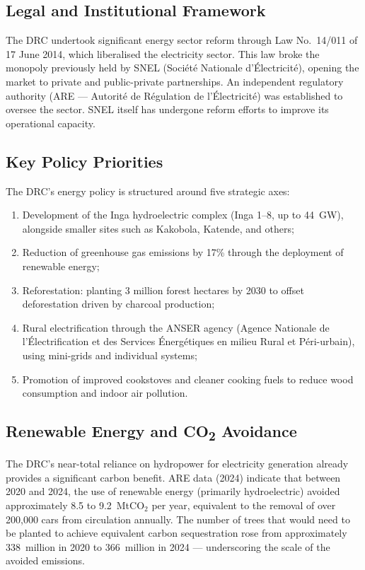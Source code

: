 \subsection{Legal and Institutional Framework}

The DRC undertook significant energy sector reform through Law No.\ 14/011 of 17 June 2014, which liberalised the electricity sector. This law broke the monopoly previously held by SNEL (Société Nationale d'Électricité), opening the market to private and public-private partnerships. An independent regulatory authority (ARE — Autorité de Régulation de l'Électricité) was established to oversee the sector. SNEL itself has undergone reform efforts to improve its operational capacity.

\subsection{Key Policy Priorities}

The DRC's energy policy is structured around five strategic axes:

\begin{enumerate}[noitemsep]
    \item Development of the Inga hydroelectric complex (Inga 1--8, up to 44~GW), alongside smaller sites such as Kakobola, Katende, and others;
    \item Reduction of greenhouse gas emissions by 17\% through the deployment of renewable energy;
    \item Reforestation: planting 3 million forest hectares by 2030 to offset deforestation driven by charcoal production;
    \item Rural electrification through the ANSER agency (Agence Nationale de l'Électrification et des Services Énergétiques en milieu Rural et Péri-urbain), using mini-grids and individual systems;
    \item Promotion of improved cookstoves and cleaner cooking fuels to reduce wood consumption and indoor air pollution.
\end{enumerate}

\subsection{Renewable Energy and CO\texorpdfstring{\textsubscript{2}}{2} Avoidance}

The DRC's near-total reliance on hydropower for electricity generation already provides a significant carbon benefit. ARE data (2024) indicate that between 2020 and 2024, the use of renewable energy (primarily hydroelectric) avoided approximately 8.5 to 9.2~MtCO$_2$ per year, equivalent to the removal of over 200{,}000 cars from circulation annually. The number of trees that would need to be planted to achieve equivalent carbon sequestration rose from approximately 338~million in 2020 to 366~million in 2024 — underscoring the scale of the avoided emissions.

